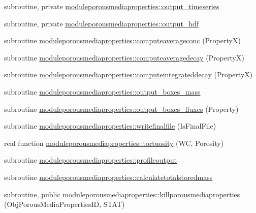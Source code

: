 \begin{DoxyCompactItemize}
\item 
subroutine, private \mbox{\hyperlink{namespacemoduleporousmediaproperties_a23e72e1a1d3d2dc5b268bbc65dbeebed}{moduleporousmediaproperties\+::output\+\_\+timeseries}}
\item 
subroutine, private \mbox{\hyperlink{namespacemoduleporousmediaproperties_afc8549b6ebf2207ac8a080ad892a6cd3}{moduleporousmediaproperties\+::output\+\_\+hdf}}
\item 
subroutine \mbox{\hyperlink{namespacemoduleporousmediaproperties_ab84b0ba6c0a1df355fb649c05128fbb3}{moduleporousmediaproperties\+::computeaverageconc}} (PropertyX)
\item 
subroutine \mbox{\hyperlink{namespacemoduleporousmediaproperties_a3d3bfa08325114d10c44b11e29d42d78}{moduleporousmediaproperties\+::computeaveragedecay}} (PropertyX)
\item 
subroutine \mbox{\hyperlink{namespacemoduleporousmediaproperties_a06f48331cb6d7a1d7fa1520565129efc}{moduleporousmediaproperties\+::computeintegrateddecay}} (PropertyX)
\item 
subroutine \mbox{\hyperlink{namespacemoduleporousmediaproperties_a4763c798964b2cbb6e1e012ba2141ff8}{moduleporousmediaproperties\+::output\+\_\+boxes\+\_\+mass}}
\item 
subroutine \mbox{\hyperlink{namespacemoduleporousmediaproperties_a7485615a66ceb16b22cd17c505c048ff}{moduleporousmediaproperties\+::output\+\_\+boxes\+\_\+fluxes}} (Property)
\item 
subroutine \mbox{\hyperlink{namespacemoduleporousmediaproperties_aed2bfb3c9121c8c37fc6bcd2ac8e1eb0}{moduleporousmediaproperties\+::writefinalfile}} (Is\+Final\+File)
\item 
real function \mbox{\hyperlink{namespacemoduleporousmediaproperties_ad5b352d84190c0b9d6cebc1a83db8ded}{moduleporousmediaproperties\+::tortuosity}} (WC, Porosity)
\item 
subroutine \mbox{\hyperlink{namespacemoduleporousmediaproperties_a223a0c32882543deab6de89c82e4295c}{moduleporousmediaproperties\+::profileoutput}}
\item 
subroutine \mbox{\hyperlink{namespacemoduleporousmediaproperties_a39cd5689166d641ddb0f961d291c6061}{moduleporousmediaproperties\+::calculatetotalstoredmass}}
\item 
subroutine, public \mbox{\hyperlink{namespacemoduleporousmediaproperties_a735090aa674c6c295828243dcd120d40}{moduleporousmediaproperties\+::killporousmediaproperties}} (Obj\+Porous\+Media\+Properties\+ID, S\+T\+AT)
\item 

\end{DoxyCompactItemize}
